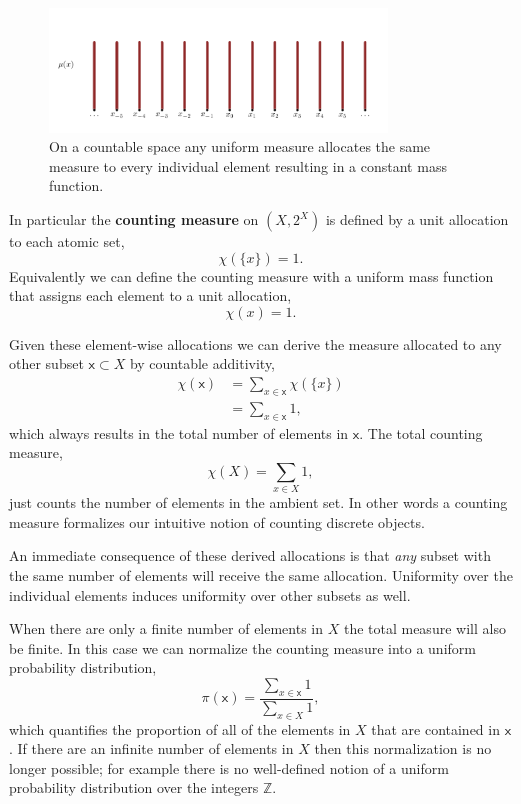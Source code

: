 \documentclass[
  letterpaper,
  DIV=11,
  numbers=noendperiod]{scrartcl}
\begin{document}
\begin{figure}

{\centering \includegraphics[width=0.8\textwidth,height=\textheight]{figures/uniform_mass_function/uniform_mass_function.pdf}

}

\caption{\label{fig-uniform-mass-function}On a countable space any
uniform measure allocates the same measure to every individual element
resulting in a constant mass function.}

\end{figure}

In particular the \textbf{counting measure} on \((X, 2^{X})\) is defined
by a unit allocation to each atomic set, \[
\chi(\{ x \}) = 1.
\] Equivalently we can define the counting measure with a uniform mass
function that assigns each element to a unit allocation, \[
\chi(x) = 1.
\]

Given these element-wise allocations we can derive the measure allocated
to any other subset \(\mathsf{x} \subset X\) by countable additivity,
\begin{align*}
\chi( \mathsf{x} )
&= \sum_{x \in \mathsf{x}} \chi(\{ x \})
\\
&= \sum_{x \in \mathsf{x}} 1,
\end{align*} which always results in the total number of elements in
\(\mathsf{x}\). The total counting measure, \[
\chi( X ) = \sum_{x \in X} 1,
\] just counts the number of elements in the ambient set. In other words
a counting measure formalizes our intuitive notion of counting discrete
objects.

An immediate consequence of these derived allocations is that \emph{any}
subset with the same number of elements will receive the same
allocation. Uniformity over the individual elements induces uniformity
over other subsets as well.

When there are only a finite number of elements in \(X\) the total
measure will also be finite. In this case we can normalize the counting
measure into a uniform probability distribution, \[
\pi ( \mathsf{x} ) =
\frac{ \sum_{x \in \mathsf{x}} 1 }{ \sum_{x \in X} 1 },
\] which quantifies the proportion of all of the elements in \(X\) that
are contained in \(\mathsf{x}\). If there are an infinite number of
elements in \(X\) then this normalization is no longer possible; for
example there is no well-defined notion of a uniform probability
distribution over the integers \(\mathbb{Z}\).
\end{document}
